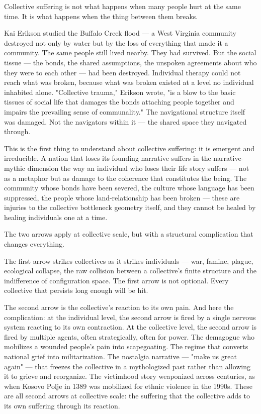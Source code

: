 Collective suffering is not what happens when many people hurt at the same time. It is what happens when the thing between them breaks.


Kai Erikson studied the Buffalo Creek flood — a West Virginia community destroyed not only by water but by the loss of everything that made it a community. The same people still lived nearby. They had survived. But the social tissue — the bonds, the shared assumptions, the unspoken agreements about who they were to each other — had been destroyed. Individual therapy could not reach what was broken, because what was broken existed at a level no individual inhabited alone. "Collective trauma," Erikson wrote, "is a blow to the basic tissues of social life that damages the bonds attaching people together and impairs the prevailing sense of communality." The navigational structure itself was damaged. Not the navigators within it — the shared space they navigated through.


This is the first thing to understand about collective suffering: it is emergent and irreducible. A nation that loses its founding narrative suffers in the narrative-mythic dimension the way an individual who loses their life story suffers — not as a metaphor but as damage to the coherence that constitutes the being. The community whose bonds have been severed, the culture whose language has been suppressed, the people whose land-relationship has been broken — these are injuries to the collective bottleneck geometry itself, and they cannot be healed by healing individuals one at a time.


The two arrows apply at collective scale, but with a structural complication that changes everything.


The first arrow strikes collectives as it strikes individuals — war, famine, plague, ecological collapse, the raw collision between a collective's finite structure and the indifference of configuration space. The first arrow is not optional. Every collective that persists long enough will be hit.


The second arrow is the collective's reaction to its own pain. And here the complication: at the individual level, the second arrow is fired by a single nervous system reacting to its own contraction. At the collective level, the second arrow is fired by multiple agents, often strategically, often for power. The demagogue who mobilizes a wounded people's pain into scapegoating. The regime that converts national grief into militarization. The nostalgia narrative — "make us great again" — that freezes the collective in a mythologized past rather than allowing it to grieve and reorganize. The victimhood story weaponized across centuries, as when Kosovo Polje in 1389 was mobilized for ethnic violence in the 1990s. These are all second arrows at collective scale: the suffering that the collective adds to its own suffering through its reaction.


